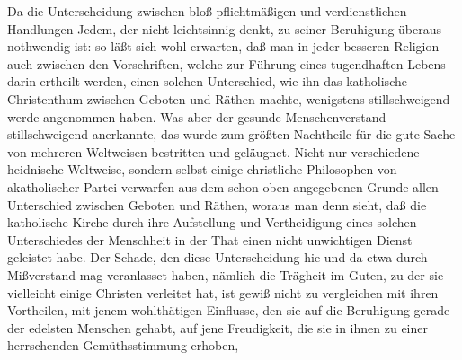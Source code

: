 Da die Unterscheidung zwischen bloß pflichtmäßigen und verdienstlichen Handlungen Jedem, der nicht leichtsinnig denkt, zu seiner Beruhigung überaus nothwendig ist: so läßt sich wohl erwarten, daß man in jeder besseren Religion auch zwischen den Vorschriften, welche zur Führung eines tugendhaften Lebens darin ertheilt werden, einen solchen Unterschied, wie ihn das katholische Christenthum zwischen Geboten und Räthen machte, wenigstens stillschweigend werde angenommen haben. Was aber der gesunde Menschenverstand stillschweigend anerkannte, das wurde zum größten Nachtheile für die gute Sache von mehreren Weltweisen bestritten und geläugnet. Nicht nur verschiedene heidnische Weltweise, sondern selbst einige christliche Philosophen von akatholischer Partei verwarfen aus dem schon oben angegebenen Grunde allen Unterschied zwischen Geboten und Räthen, woraus man denn sieht, daß die katholische Kirche durch ihre Aufstellung und Vertheidigung eines solchen Unterschiedes der Menschheit in der That einen nicht unwichtigen Dienst geleistet habe. Der Schade, den diese Unterscheidung hie und da etwa durch Mißverstand mag veranlasset haben, nämlich die Trägheit im Guten, zu der sie vielleicht einige Christen verleitet hat, ist gewiß nicht zu vergleichen mit ihren Vortheilen, mit jenem wohlthätigen Einflusse, den sie auf die Beruhigung gerade der edelsten Menschen gehabt, auf jene Freudigkeit, die sie in ihnen zu einer herrschenden Gemüthsstimmung erhoben, \usw\

